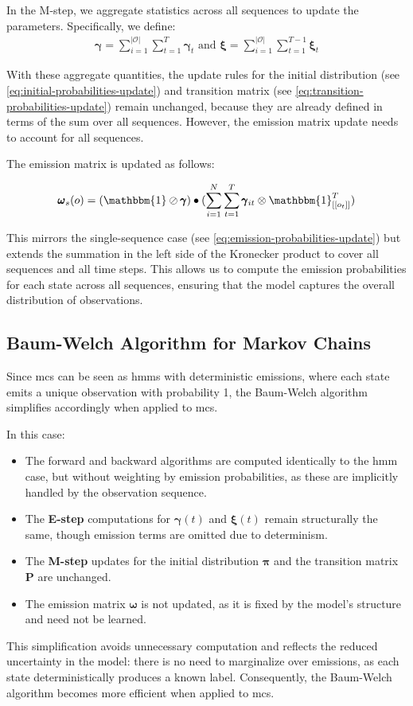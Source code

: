 In the M-step, we aggregate statistics across all sequences to update the parameters.
Specifically, we define:
\begin{align}
    \pmb{\gamma} = \sum_{i=1}^{|\mathcal{O}|}\sum_{t=1}^{T} \pmb{\gamma}_t
    \text{ and }
    \pmb{\xi} = \sum_{i=1}^{|\mathcal{O}|}\sum_{t=1}^{T-1} \pmb{\xi}_t
\end{align}

With these aggregate quantities, the update rules for the initial distribution (see \autoref{eq:initial-probabilities-update}) and transition matrix (see \autoref{eq:transition-probabilities-update}) remain unchanged, because they are already defined in terms of the sum over all sequences.
However, the emission matrix update needs to account for all sequences.

The emission matrix is updated as follows:

\begin{equation}
    \pmb{\omega}
    _s(o) = (\mathbbm{1} \oslash \pmb{\gamma}) \bullet (\sum_{i=1}^N \sum_{t=1}^{T} \pmb{\gamma}_{it} \otimes \mathbbm{1}_{[[o_t]]}^{T})
    \label{eq:omega-update}
\end{equation}

This mirrors the single-sequence case (see \autoref{eq:emission-probabilities-update}) but extends the summation in the left side of the Kronecker product to cover all sequences and all time steps.
This allows us to compute the emission probabilities for each state across all sequences, ensuring that the model captures the overall distribution of observations.

\subsection{Baum-Welch Algorithm for Markov Chains}\label{subsec:baum-welch-mc}
Since \glspl{mc} can be seen as \glspl{hmm} with deterministic emissions, where each state emits a unique observation with probability 1, the Baum-Welch algorithm simplifies accordingly when applied to \glspl{mc}.

In this case:

\begin{itemize}
    \item The forward and backward algorithms are computed identically to the \gls{hmm} case, but without weighting by emission probabilities, as these are implicitly handled by the observation sequence.
    \item The \textbf{E-step} computations for $\pmb{\gamma}(t)$ and $\pmb{\xi}(t)$ remain structurally the same, though emission terms are omitted due to determinism.
    \item The \textbf{M-step} updates for the initial distribution $\pmb{\pi}$ and the transition matrix $\pmb{P}$ are unchanged.
    \item The emission matrix $\pmb{\omega}$ is not updated, as it is fixed by the model's structure and need not be learned.
\end{itemize}

This simplification avoids unnecessary computation and reflects the reduced uncertainty in the model: there is no need to marginalize over emissions, as each state deterministically produces a known label.
Consequently, the Baum-Welch algorithm becomes more efficient when applied to \glspl{mc}.
